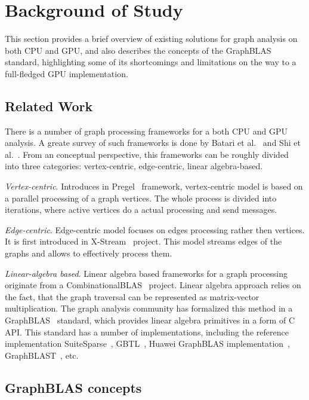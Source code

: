 \section{Background of Study}

This section provides a brief overview of existing solutions for graph analysis on both CPU and GPU, and also describes the concepts of the GraphBLAS standard, highlighting some of its shortcomings and limitations on the way to a full-fledged GPU implementation.

\subsection{Related Work}

There is a number of graph processing frameworks for a both CPU and GPU analysis. A greate survey of such frameworks is done by Batari et al.~\cite{article:batarfi_survey_graphs} and Shi et al.~\cite{article:shi_survey_graphs}. From an conceptual perspective, this frameworks can be roughly divided into three categories: vertex-centric, edge-centric, linear algebra-based.

\textit{Vertex-centric}. Introduces in Pregel~\cite{article:pregel} framework, vertex-centric model is based on a parallel processing of a graph vertices. The whole process is divided into iterations, where active vertices do a actual processing and send messages.  

\textit{Edge-centric}. Edge-centric model focuses on edges processing rather then vertices. It is first introduced in X-Stream~\cite{article:xstream} project. This model streams edges of the graphs and allows to effectively process them. 

\textit{Linear-algebra based}. Linear algebra based frameworks for a graph processing originate from a CombinationalBLAS~\cite{article:combblas} project. Linear algebra approach relies on the fact, that the graph traversal can be represented as matrix-vector multiplication. The graph analysis community has formalized this method in a GraphBLAS~\cite{7761646} standard, which provides linear algebra primitives in a form of C API. This standard has a number of implementations, including the reference implementation SuiteSparse~\cite{10.1145/3322125}, GBTL~\cite{7529957}, Huawei GraphBLAS implementation~\cite{article:hu_graphblas_impl}, GraphBLAST~\cite{yang2019graphblast}, etc.

\subsection{GraphBLAS concepts}

